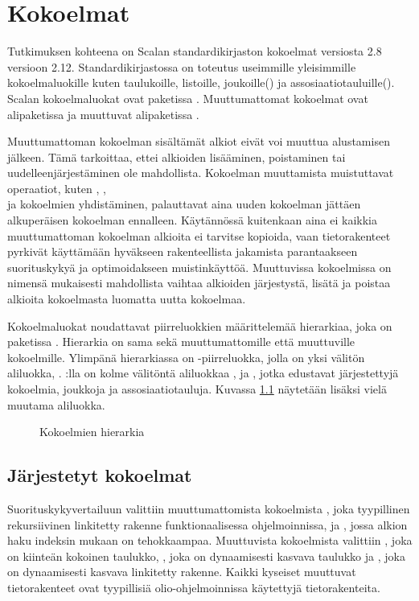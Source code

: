 \chapter{Kokoelmat} \label{Kokoelmat}
Tutkimuksen kohteena on Scalan standardikirjaston kokoelmat versiosta 2.8 versioon 2.12. Standardikirjastossa on toteutus useimmille yleisimmille kokoelmaluokille kuten taulukoille, listoille, joukoille() ja assosiaatiotauluille(). Scalan kokoelmaluokat ovat paketissa . Muuttumattomat kokoelmat ovat alipaketissa  ja muuttuvat alipaketissa .
\cite{scalaCollections}

Muuttumattoman kokoelman sisältämät alkiot eivät voi muuttua alustamisen jälkeen. Tämä tarkoittaa, ettei alkioiden lisääminen, poistaminen tai uudelleenjärjestäminen ole mahdollista. Kokoelman muuttamista muistuttavat operaatiot, kuten , , \\ ja kokoelmien yhdistäminen, palauttavat aina uuden kokoelman jättäen alkuperäisen kokoelman ennalleen. Käytännössä kuitenkaan aina ei kaikkia muuttumattoman kokoelman alkioita ei tarvitse kopioida, vaan tietorakenteet pyrkivät käyttämään hyväkseen rakenteellista jakamista parantaakseen suorituskykyä ja optimoidakseen muistinkäyttöä. Muuttuvissa kokoelmissa on nimensä mukaisesti mahdollista vaihtaa alkioiden järjestystä, lisätä ja poistaa alkioita kokoelmasta luomatta uutta kokoelmaa.
\cite{scalaCollections}
\cite[Luku 22]{prorgrammingInScala3rd}

Kokoelmaluokat noudattavat piirreluokkien määrittelemää hierarkiaa, joka on paketissa . Hierarkia on sama sekä muuttumattomille että muuttuville kokoelmille. Ylimpänä hierarkiassa on -piirreluokka, jolla on yksi välitön aliluokka, . :lla on kolme välitöntä aliluokkaa ,  ja , jotka edustavat järjestettyjä kokoelmia, joukkoja ja assosiaatiotauluja. Kuvassa \ref{kokoelmahierarkia} näytetään lisäksi vielä muutama aliluokka.
\cite{scalaCollections}
\begin{figure}[h]
    \centering
    \caption{Kokoelmien hierarkia}\label{kokoelmahierarkia}
\end{figure}


\section{Järjestetyt kokoelmat}
Suorituskykyvertailuun valittiin muuttumattomista kokoelmista , joka tyypillinen rekursiivinen linkitetty rakenne funktionaalisessa ohjelmoinnissa, ja , jossa alkion haku indeksin mukaan on tehokkaampaa. Muuttuvista kokoelmista valittiin , joka on kiinteän kokoinen taulukko, , joka on dynaamisesti kasvava taulukko ja , joka on dynaamisesti kasvava linkitetty rakenne. Kaikki kyseiset muuttuvat tietorakenteet ovat tyypillisiä olio-ohjelmoinnissa käytettyjä tietorakenteita.

